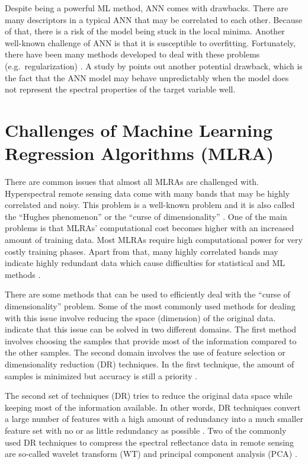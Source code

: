 \documentclass[a4paper, twoside]{templates/ociamthesis}
\begin{document}
Despite being a powerful ML method, ANN comes with drawbacks. There are many descriptors in a typical ANN that may be correlated to each other. Because of that, there is a risk of the model being stuck in the local minima. Another well-known challenge of ANN is that it is susceptible to overfitting. Fortunately, there have been many methods developed to deal with these problems (e.g.~regularization) \citep{ghasemi2018neural}. A study by \citet{schlerf2006inversion} points out another potential drawback, which is the fact that the ANN model may behave unpredictably when the model does not represent the spectral properties of the target variable well.

\hypertarget{chml}{%
\section{Challenges of Machine Learning Regression Algorithms (MLRA)}\label{chml}}

There are common issues that almost all MLRAs are challenged with. Hyperspectral remote sensing data come with many bands that may be highly correlated and noisy. This problem is a well-known problem and it is also called the ``Hughes phenomenon'' \citep{hughes1968mean} or the ``curse of dimensionality'' \citep{danner2021efficient}. One of the main problems is that MLRAs' computational cost becomes higher with an increased amount of training data. Most MLRAs require high computational power for very costly training phases. Apart from that, many highly correlated bands may indicate highly redundant data which cause difficulties for statistical and ML methods \citep{rivera2017hyperspectral}.

There are some methods that can be used to efficiently deal with the ``curse of dimensionality'' problem. Some of the most commonly used methods for dealing with this issue involve reducing the space (dimension) of the original data. \citet{rivera2017hyperspectral} indicate that this issue can be solved in two different domains. The first method involves choosing the samples that provide most of the information compared to the other samples. The second domain involves the use of feature selection or dimensionality reduction (DR) techniques. In the first technique, the amount of samples is minimized but accuracy is still a priority \citep{rivera2017hyperspectral}.

The second set of techniques (DR) tries to reduce the original data space while keeping most of the information available. In other words, DR techniques convert a large number of features with a high amount of redundancy into a much smaller feature set with no or as little redundancy as possible \citep{lee2007nonlinear}. Two of the commonly used DR techniques to compress the spectral reflectance data in remote sensing are so-called wavelet transform (WT) and principal component analysis (PCA) \citep{ke2016estimating}.
\end{document}
